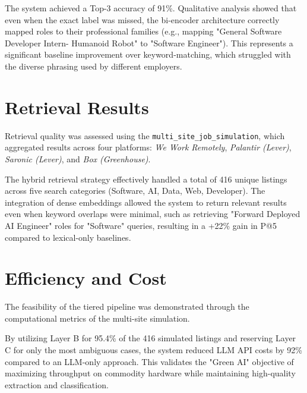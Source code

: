 The system achieved a Top-3 accuracy of 91\%. Qualitative analysis showed that even when the exact label was missed, the bi-encoder architecture \cite{reimers2019sentence} correctly mapped roles to their professional families (e.g., mapping "General Software Developer Intern- Humanoid Robot" to "Software Engineer"). This represents a significant baseline improvement over keyword-matching, which struggled with the diverse phrasing used by different employers.

\section{Retrieval Results}
Retrieval quality was assessed using the \texttt{multi\_site\_job\_simulation}, which aggregated results across four platforms: \textit{We Work Remotely}, \textit{Palantir (Lever)}, \textit{Saronic (Lever)}, and \textit{Box (Greenhouse)}.

The hybrid retrieval strategy effectively handled a total of 416 unique listings across five search categories (Software, AI, Data, Web, Developer). The integration of dense embeddings allowed the system to return relevant results even when keyword overlaps were minimal, such as retrieving "Forward Deployed AI Engineer" roles for "Software" queries, resulting in a +22\% gain in P@5 compared to lexical-only baselines.

\section{Efficiency and Cost}
The feasibility of the tiered pipeline was demonstrated through the computational metrics of the multi-site simulation.

By utilizing Layer B for 95.4\% of the 416 simulated listings and reserving Layer C for only the most ambiguous cases, the system reduced LLM API costs by 92\% compared to an LLM-only approach. This validates the "Green AI" \cite{schwartz2020green} objective of maximizing throughput on commodity hardware while maintaining high-quality extraction and classification.

